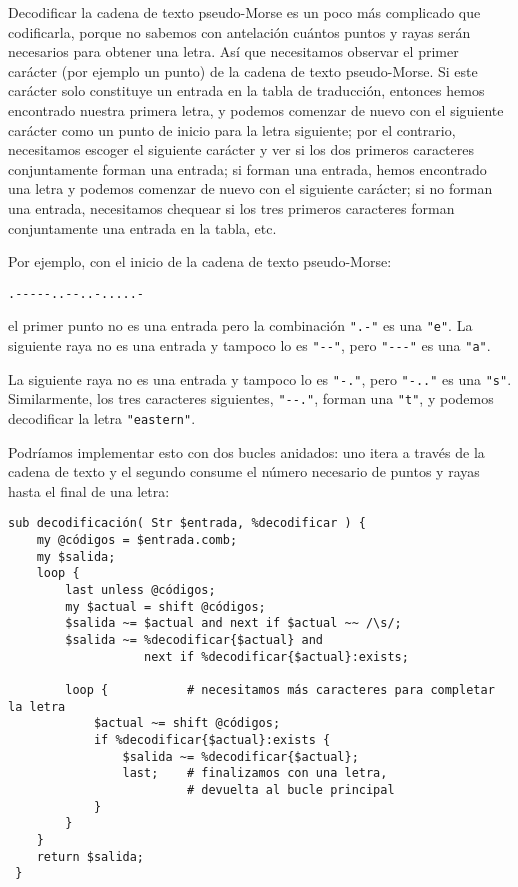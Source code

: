 Decodificar la cadena de texto pseudo-Morse es un poco más complicado
que codificarla, porque no sabemos con antelación cuántos puntos y rayas
serán necesarios para obtener una letra. Así que necesitamos observar
el primer carácter (por ejemplo un punto) de la cadena de texto pseudo-Morse.
Si este carácter solo constituye un entrada en la tabla de traducción, 
entonces hemos encontrado nuestra primera letra, y podemos comenzar
de nuevo con el siguiente carácter como un punto de inicio para la
letra siguiente; por el contrario, necesitamos escoger el siguiente carácter
y ver si los dos primeros caracteres conjuntamente forman una entrada; si 
forman una entrada, hemos encontrado una letra y podemos comenzar de nuevo 
con el siguiente carácter; si no forman una entrada, necesitamos chequear si
los tres primeros caracteres forman conjuntamente una entrada en la
tabla, etc.

Por ejemplo, con el inicio de la cadena de texto pseudo-Morse:
\begin{verbatim}
.-----..--..-.....-
\end{verbatim}
el primer punto no es una entrada pero la combinación \verb|".-"| es una \verb|"e"|.
La siguiente raya no es una entrada y tampoco lo es \verb|"--"|, pero 
\verb|"---"| es una \verb|"a"|.

La siguiente raya no es una entrada y tampoco lo es \verb|"-."|, pero \verb|"-.."|
es una \verb|"s"|. Similarmente, los tres caracteres siguientes, \verb|"--."|,
forman una \verb|"t"|, y podemos decodificar la letra \verb|"eastern"|.

Podríamos implementar esto con dos bucles anidados: uno itera a través 
de la cadena de texto y el segundo consume el número necesario de puntos
y rayas hasta el final de una letra:

\begin{verbatim}
sub decodificación( Str $entrada, %decodificar ) {
    my @códigos = $entrada.comb;
    my $salida;
    loop {
        last unless @códigos;
        my $actual = shift @códigos;
        $salida ~= $actual and next if $actual ~~ /\s/;
        $salida ~= %decodificar{$actual} and 
                   next if %decodificar{$actual}:exists;
        
        loop {           # necesitamos más caracteres para completar la letra
            $actual ~= shift @códigos;
            if %decodificar{$actual}:exists {
                $salida ~= %decodificar{$actual};
                last;    # finalizamos con una letra, 
                         # devuelta al bucle principal
            }
        } 
    }
    return $salida;
 }
\end{verbatim}

